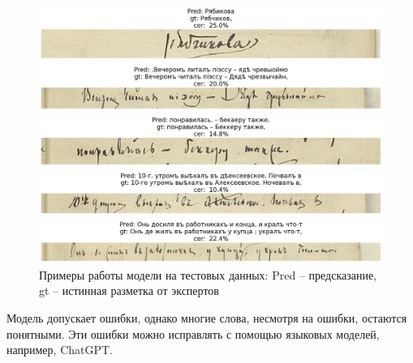 \documentclass{extarticle}
\begin{document}
\begin{figure}[h!]
	\centering
	\begin{minipage}{0.99\textwidth}
		\centering
		\includegraphics[width=\textwidth]{images/pred_1.jpg}
	\end{minipage}
	\begin{minipage}{0.99\textwidth}
		\centering
		\includegraphics[width=\textwidth]{images/pred_2.jpg}
	\end{minipage}
	\begin{minipage}{0.99\textwidth}
		\centering
		\includegraphics[width=\textwidth]{images/pred_3.jpg}
	\end{minipage}
	\begin{minipage}{0.99\textwidth}
		\centering
		\includegraphics[width=\textwidth]{images/pred_4.jpg}
	\end{minipage}
	\begin{minipage}{0.99\textwidth}
		\centering
		\includegraphics[width=\textwidth]{images/pred_5.jpg}
	\end{minipage}
	
	\caption{Примеры работы модели на тестовых данных: Pred -- предсказание, gt -- истинная разметка от экспертов}
	\label{fig:cv_examples}
\end{figure}

Модель допускает ошибки, однако многие слова, несмотря на ошибки, остаются понятными. Эти ошибки можно исправлять с помощью языковых моделей, например, ChatGPT.
\end{document}
